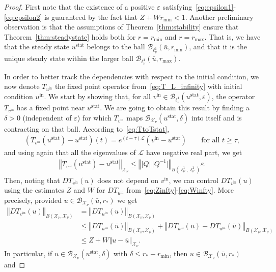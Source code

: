 \documentclass[10pt,a4paper]{article}
\theoremstyle{plain}
\newcommand{\B}{\mathcal{B}}
\renewcommand{\B}{\mathcal{B}}
\renewcommand{\L}{\mathcal{L}}
\newcommand{\X}{\mathcal{X}}
\newcommand{\bu}{\bar{u}}
\newcommand{\1}{\mathbf{1}}
\newcommand{\rstar}{r_*}
\newcommand{\uin}{{u^{\mathrm{in}}}}
\newcommand{\vin}{{v^{\mathrm{in}}}}
\newcommand{\stat}{\mathrm{stat}}
\begin{document}
\begin{proof}
First note that the existence of a positive $\varepsilon$ satisfying~\eqref{eq:epsilon1}-\eqref{eq:epsilon2} is guaranteed by the fact that $Z + W r_{\min} < 1$. Another preliminary observation is that the assumptions of Theorem~\ref{thm:stability} ensure that Theorem~\ref{thm:steadystate} holds both for $r=r_{\min}$ and $r=r_{\max}$. That is, we have that the steady state $u^\stat$ belongs to the ball $\B_{\ell^1_\nu}(\bu,r_{\min})$, and that it is the unique steady state within the larger ball $\B_{\ell^1_\nu}(\bu,r_{\max})$.

In order to better track the dependencies with respect to the initial condition, we now denote $T_\uin$ the fixed point operator from~\eqref{eq:T_L_infinity} with initial condition $\uin$. We start by showing that, for all $\vin\in\B_{\ell^1_\nu}(u^\stat,\varepsilon)$, the operator $T_\vin$ has a fixed point near $u^\stat$. We are going to obtain this result by finding a $\delta>0$ (independent of $\varepsilon$) for which $T_\vin$ maps $\B_{\X_\nu}(u^\stat,\delta)$ into itself and is contracting on that ball.
According to~\eqref{eq:TtoTstat},
\begin{align*}
\left(T_\vin(u^\stat) - u^\stat\right)(t) = e^{(t-\tau)\L}\left(\vin - u^\stat\right) \qquad \text{for all }t\geq \tau,
\end{align*}
and using again that all the eigenvalues of $\L$ have negative real part, we get
\begin{align}
\label{eq:Yvin}
\left\Vert T_\vin(u^\stat) - u^\stat \right\Vert_{\X_\nu} \leq \left\Vert \vert Q\vert\, \vert Q^{-1}\vert \right\Vert_{B(\ell^1_\nu,\ell^1_\nu)} \varepsilon.
\end{align}
Then, noting that $DT_\vin(u)$ does not depend on $\vin$, we can control $ DT_\vin(u)$ using the estimates $Z$ and $W$ for $DT_\uin$ from~\eqref{eq:Zinfty}-\eqref{eq:Winfty}. More precisely, provided $u\in\B_{\X_\nu}(\bu,\rstar)$ we get
\begin{align*}
\left\Vert DT_\vin(u) \right\Vert_{B(\X_\nu,\X_\nu)} &= \left\Vert DT_\uin(u) \right\Vert_{B(\X_\nu,\X_\nu)} \\
&\leq \left\Vert DT_\uin(\bu) \right\Vert_{B(\X_\nu,\X_\nu)} + \left\Vert DT_\uin(u) - DT_\uin(\bu) \right\Vert_{B(\X_\nu,\X_\nu)} \\
&\leq Z + W \left\Vert u - \bu\right\Vert_{\X_\nu}.
\end{align*}
In particular, if $u\in \B_{\X_\nu}(u^\stat,\delta)$ with $\delta\leq \rstar -r_{\min}$, then $u\in\B_{\X_\nu}(\bu,\rstar)$ and

\end{proof}
\end{document}
